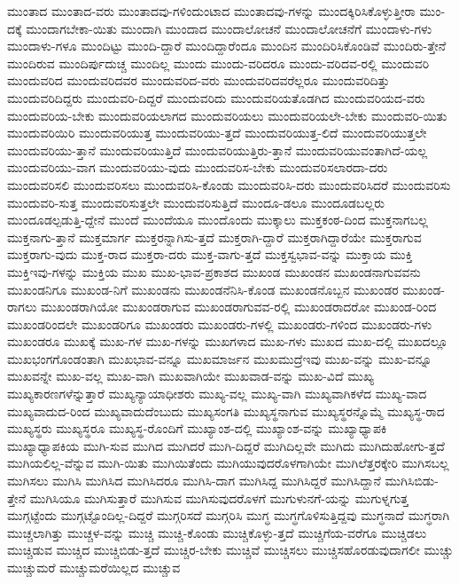 {ಮುಂತಾದ
ಮುಂತಾದ-ವರು
ಮುಂತಾದವು-ಗಳಿಂದುಂಟಾದ
ಮುಂತಾದವು-ಗಳನ್ನು
ಮುಂದಕ್ಕಿರಿಸಿಕೊಳ್ಳುತ್ತೀರಾ
ಮುಂ-ದಕ್ಕೆ
ಮುಂದಾಗಬೇಕಾ-ಯಿತು
ಮುಂದಾಗಿ
ಮುಂದಾದ
ಮುಂದಾಲೋಚನೆ
ಮುಂದಾಲೋಚನೆಗೆ
ಮುಂದಾಳು-ಗಳು
ಮುಂದಾಳು-ಗಳೂ
ಮುಂದಿಟ್ಟು
ಮುಂದಿ-ದ್ದಾರೆ
ಮುಂದಿದ್ದಾರೆಂದೂ
ಮುಂದಿನ
ಮುಂದಿರಿಸಿಕೊಂಡಿವೆ
ಮುಂದಿರು-ತ್ತೇನೆ
ಮುಂದಿರುವ
ಮುಂದಿರ್ಪುದುಚ್ಚ
ಮುಂದಿಲ್ಲ
ಮುಂದು
ಮುಂದು-ವರಿದರೂ
ಮುಂದು-ವರಿದವ-ರಲ್ಲಿ
ಮುಂದುವರಿ
ಮುಂದುವರಿದ
ಮುಂದುವರಿದವರ
ಮುಂದುವರಿದ-ವರು
ಮುಂದುವರಿದವರೆಲ್ಲರೂ
ಮುಂದುವರಿದಿತ್ತು
ಮುಂದುವರಿದಿದ್ದರು
ಮುಂದುವರಿ-ದಿದ್ದರೆ
ಮುಂದುವರಿದು
ಮುಂದುವರಿಯತೊಡಗಿದ
ಮುಂದುವರಿಯದ-ವರು
ಮುಂದುವರಿಯ-ಬೇಕು
ಮುಂದುವರಿಯಲಾಗದ
ಮುಂದುವರಿಯಲು
ಮುಂದುವರಿಯಲೇ-ಬೇಕು
ಮುಂದುವರಿ-ಯಿತು
ಮುಂದುವರಿಯಿರಿ
ಮುಂದುವರಿಯುತ್ತ
ಮುಂದುವರಿಯು-ತ್ತದೆ
ಮುಂದುವರಿಯುತ್ತ-ಲಿದೆ
ಮುಂದುವರಿಯುತ್ತಲೇ
ಮುಂದುವರಿಯು-ತ್ತಾನೆ
ಮುಂದುವರಿಯುತ್ತಿದೆ
ಮುಂದುವರಿಯುತ್ತಿರು-ತ್ತಾನೆ
ಮುಂದುವರಿಯುವಂತಾಗಿದೆ-ಯಲ್ಲ
ಮುಂದುವರಿಯು-ವಾಗ
ಮುಂದುವರಿಯು-ವುದು
ಮುಂದುವರಿಸ-ಬೇಕು
ಮುಂದುವರಿಸಲಾರದಾ-ದರು
ಮುಂದುವರಿಸಲಿ
ಮುಂದುವರಿಸಲು
ಮುಂದುವರಿಸಿ-ಕೊಂಡು
ಮುಂದುವರಿಸಿ-ದರು
ಮುಂದುವರಿಸಿದರೆ
ಮುಂದುವರಿಸು
ಮುಂದುವರಿ-ಸುತ್ತ
ಮುಂದುವರಿಸುತ್ತಲೇ
ಮುಂದುವರಿಸುತ್ತಿದೆ
ಮುಂದೂ-ಡಲೂ
ಮುಂದೂಡಬಲ್ಲರು
ಮುಂದೂಡಲ್ಪಡುತ್ತಿ-ದ್ದೇನೆ
ಮುಂದೆ
ಮುಂದೆಯೂ
ಮುಂದೊಂದು
ಮುಕ್ಕಾಲು
ಮುಕ್ತಕಂಠ-ದಿಂದ
ಮುಕ್ತನಾಗಬಲ್ಲ
ಮುಕ್ತನಾಗು-ತ್ತಾನೆ
ಮುಕ್ತಮಾರ್ಗ
ಮುಕ್ತರನ್ನಾಗಿಸು-ತ್ತದೆ
ಮುಕ್ತರಾಗಿ-ದ್ದಾರೆ
ಮುಕ್ತರಾಗಿದ್ದಾರೆಯೇ
ಮುಕ್ತರಾಗುವ
ಮುಕ್ತರಾಗು-ವುದು
ಮುಕ್ತ-ರಾದ
ಮುಕ್ತರಾ-ದರು
ಮುಕ್ತ-ವಾಗು-ತ್ತದೆ
ಮುಕ್ತಸ್ವಭಾವ-ವನ್ನು
ಮುಕ್ತಾಯ
ಮುಕ್ತಿ
ಮುಕ್ತಿಇವು-ಗಳನ್ನು
ಮುಕ್ತಿಯ
ಮುಖ
ಮುಖ-ಭಾವ-ಪ್ರಕಾಶದ
ಮುಖಂಡ
ಮುಖಂಡನ
ಮುಖಂಡನಾಗುವವನು
ಮುಖಂಡನಿಗೂ
ಮುಖಂಡ-ನಿಗೆ
ಮುಖಂಡನು
ಮುಖಂಡನೆನಿಸಿ-ಕೊಂಡ
ಮುಖಂಡನೊಬ್ಬನ
ಮುಖಂಡರ
ಮುಖಂಡ-ರಾಗಲು
ಮುಖಂಡರಾಗಿಯೋ
ಮುಖಂಡರಾಗುವ
ಮುಖಂಡರಾಗುವವ-ರಲ್ಲಿ
ಮುಖಂಡರಾದರೋ
ಮುಖಂಡ-ರಿಂದ
ಮುಖಂಡರಿಂದಲೇ
ಮುಖಂಡರಿಗೂ
ಮುಖಂಡರು
ಮುಖಂಡರು-ಗಳಲ್ಲಿ
ಮುಖಂಡರು-ಗಳಿಂದ
ಮುಖಂಡರು-ಗಳು
ಮುಖಂಡರೂ
ಮುಖಕ್ಕೆ
ಮುಖ-ಗಳ
ಮುಖ-ಗಳನ್ನು
ಮುಖಗಳಾದ
ಮುಖ-ಗಳು
ಮುಖದ
ಮುಖ-ದಲ್ಲಿ
ಮುಖದಲ್ಲೂ
ಮುಖಭಂಗಗೊಂಡಂತಾಗಿ
ಮುಖಭಾವ-ವನ್ನೂ
ಮುಖಮಾರ್ಜನ
ಮುಖಮುದ್ರೆಇವು
ಮುಖ-ವನ್ನು
ಮುಖ-ವನ್ನೂ
ಮುಖವನ್ನೇ
ಮುಖ-ವಲ್ಲ
ಮುಖ-ವಾಗಿ
ಮುಖವಾಗಿಯೇ
ಮುಖವಾಡ-ವನ್ನು
ಮುಖ-ವಿದೆ
ಮುಖ್ಯ
ಮುಖ್ಯಕಾರಣಗಳೆನ್ನುತ್ತಾರೆ
ಮುಖ್ಯನ್ಯಾಯಾಧೀಶರು
ಮುಖ್ಯ-ವಲ್ಲ
ಮುಖ್ಯ-ವಾಗಿ
ಮುಖ್ಯವಾಗಿಕಳೆದ
ಮುಖ್ಯ-ವಾದ
ಮುಖ್ಯವಾದುದ-ರಿಂದ
ಮುಖ್ಯವಾದುದೆಂಬುದು
ಮುಖ್ಯಸಂಗತಿ
ಮುಖ್ಯಸ್ಥನಾಗುವ
ಮುಖ್ಯಸ್ಥರನ್ನೊಮ್ಮೆ
ಮುಖ್ಯಸ್ಥ-ರಾದ
ಮುಖ್ಯಸ್ಥರು
ಮುಖ್ಯಸ್ಥರೂ
ಮುಖ್ಯಸ್ಥ-ರೊಂದಿಗೆ
ಮುಖ್ಯಾಂಶ-ದಲ್ಲಿ
ಮುಖ್ಯಾಂಶ-ವನ್ನು
ಮುಖ್ಯಾಧ್ಯಾಪಕಿ
ಮುಖ್ಯಾಧ್ಯಾಪಕಿಯ
ಮುಗಿ-ಸುವ
ಮುಗಿದ
ಮುಗಿದರೆ
ಮುಗಿ-ದಿದ್ದರೆ
ಮುಗಿದಿಲ್ಲವೇ
ಮುಗಿದು
ಮುಗಿದುಹೋಗು-ತ್ತದೆ
ಮುಗಿಯಲಿಲ್ಲ-ವೆನ್ನುವ
ಮುಗಿ-ಯಿತು
ಮುಗಿಯಿತೆಂದು
ಮುಗಿಯುವುದರೊಳಗಾಗಿಯೇ
ಮುಗಿಲೆತ್ತರಕ್ಕೇರಿ
ಮುಗಿಸಬಲ್ಲ
ಮುಗಿಸಲು
ಮುಗಿಸಿ
ಮುಗಿಸಿದ
ಮುಗಿಸಿದರೂ
ಮುಗಿಸಿ-ದಾಗ
ಮುಗಿಸಿದ್ದ
ಮುಗಿಸಿದ್ದರೆ
ಮುಗಿಸಿದ್ದಾನೆ
ಮುಗಿಸಿಬಿಡು-ತ್ತೇನೆ
ಮುಗಿಸಿಯೂ
ಮುಗಿಸುತ್ತಾರೆ
ಮುಗಿಸುವ
ಮುಗಿಸುವುದರೊಳಗೆ
ಮುಗುಳುನಗೆ-ಯನ್ನು
ಮುಗುಳ್ನಗುತ್ತ
ಮುಗ್ಗಟ್ಟೆಂದು
ಮುಗ್ಗಟ್ಟೊಂದಿಲ್ಲ-ದಿದ್ದರೆ
ಮುಗ್ಗರಿಸದೆ
ಮುಗ್ಗರಿಸಿ
ಮುಗ್ಧ
ಮುಗ್ಧಗೊಳಿಸುತ್ತಿದ್ದವು
ಮುಗ್ಧನಾದೆ
ಮುಗ್ಧರಾಗಿ
ಮುಚ್ಚಲಾಗಿತ್ತು
ಮುಚ್ಚಳ-ವನ್ನು
ಮುಚ್ಚಿ
ಮುಚ್ಚಿ-ಕೊಂಡು
ಮುಚ್ಚಿಕೊಳ್ಳು-ತ್ತದೆ
ಮುಚ್ಚಿಗೆಯ-ವರೆಗೂ
ಮುಚ್ಚಿಡಲು
ಮುಚ್ಚಿಡುವ
ಮುಚ್ಚಿದ
ಮುಚ್ಚಿಬಿಡು-ತ್ತದೆ
ಮುಚ್ಚಿರ-ಬೇಕು
ಮುಚ್ಚಿವೆ
ಮುಚ್ಚಿಸಲು
ಮುಚ್ಚಿಸಹೊರಡುವುದಾಗಲೀ
ಮುಚ್ಚು
ಮುಚ್ಚುಮರೆ
ಮುಚ್ಚುಮರೆಯಿಲ್ಲದ
ಮುಚ್ಚುವ
}
